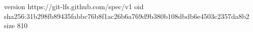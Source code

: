 version https://git-lfs.github.com/spec/v1
oid sha256:31b298fb89435fabbc76b8f1ac26b6a769d9b380b108dbdb6e4503c2357da8b2
size 810
